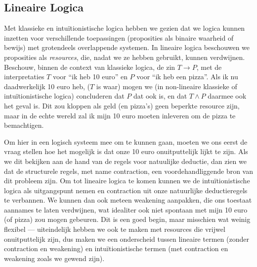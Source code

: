 \subsection{Lineaire Logica}
Met klassieke en intu\"itionistische logica hebben we gezien dat we logica kunnen inzetten voor verschillende toepassingen (proposities als binaire waarheid of bewijs) met grotendeels overlappende systemen. In lineaire logica beschouwen we proposities als \emph{resources}, die, nadat we ze hebben gebruikt, kunnen verdwijnen. Beschouw, binnen de context van klassieke logica, de zin $T \to P$, met de interpretaties $T$ voor \enquote{ik heb 10 euro} en $P$ voor \enquote{ik heb een pizza}. Als ik nu daadwerkelijk 10 euro heb, ($T$ is waar) mogen we (in non-lineaire klassieke of intu\"itionistische logica) concluderen dat $P$ dat ook is, en dat $T \land P$ daarmee ook het geval is. Dit zou kloppen als geld (en pizza's) geen beperkte resource zijn, maar in de echte wereld zal ik mijn 10 euro moeten inleveren om de pizza te bemachtigen.

Om hier in een logisch systeem mee om te kunnen gaan, moeten we ons eerst de vraag stellen hoe het mogelijk is dat onze 10 euro onuitputtelijk lijkt te zijn. Als we dit bekijken aan de hand van de regels voor natuulijke deductie, dan zien we dat de structurele regels, met name contraction, een voordehandliggende bron van dit probleem zijn. Om tot lineaire logica te komen kunnen we de intu\"itionistische logica als uitgangspunt nemen en contraction uit onze natuurlijke deductieregels te verbannen. We kunnen dan ook meteen weakening aanpakken, die ons toestaat aannames te laten verdwijnen, wat idealiter ook niet spontaan met mijn 10 euro (of pizza) zou mogen gebeuren. Dit is een goed begin, maar misschien wat weinig flexibel --- uiteindelijk hebben we ook te maken met resources die vrijwel onuitputtelijk zijn, dus maken we een onderscheid tussen lineaire termen (zonder contraction en weakening) en intu\"itionistische termen (met contraction en weakening zoals we gewend zijn).

